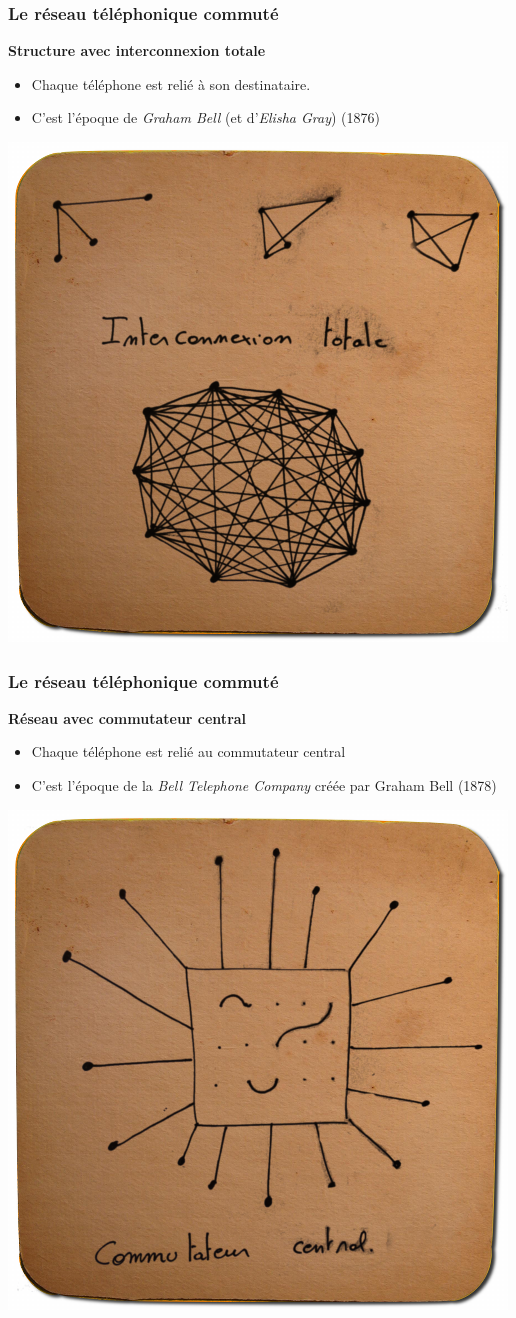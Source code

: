 \begin{frame}[fragile]
  \frametitle{Le réseau téléphonique commuté}
{\large\bf Structure avec interconnexion totale}
\begin{itemize}
	\item Chaque téléphone est relié à son destinataire.
	\item C'est l'époque de \textit{Graham Bell} (et d'\textit{Elisha Gray}) (1876)
\end{itemize}
\begin{center}
	\includegraphics[width=.53\linewidth]{img/sousbock-rtc-interconnexiontotale.png}
\end{center}
\end{frame}

\begin{frame}[fragile]
  \frametitle{Le réseau téléphonique commuté}
{\large\bf Réseau avec commutateur central}
\begin{itemize}
	\item Chaque téléphone est relié au commutateur central
	\item C'est l'époque de la \textit{Bell Telephone Company} créée par Graham Bell (1878)
\end{itemize}
\begin{center}
	\includegraphics[width=.5\linewidth]{img/sousbock-rtc-commutateurcentral.png}
\end{center}
\end{frame}

